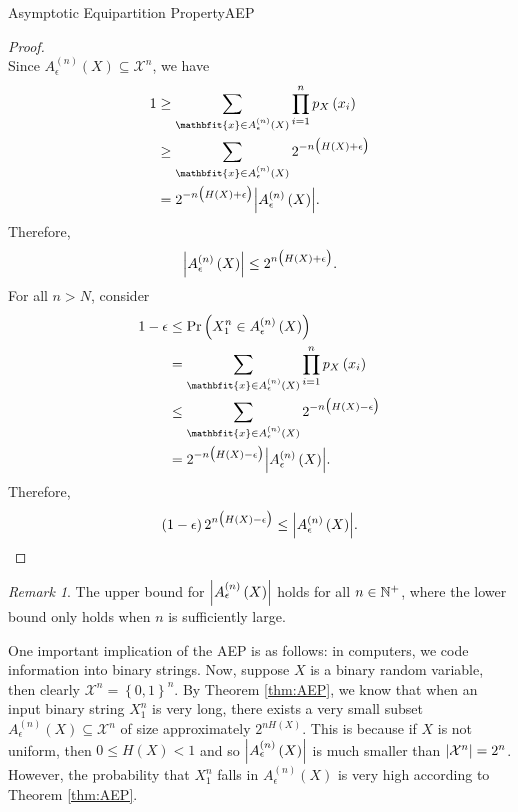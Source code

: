\documentclass[math, code]{amznotes}
\theoremstyle{remark}
\newtheorem*{remark}{Remark}
\begin{document}
\begin{thmbox}{Asymptotic Equipartition Property}{AEP}
\begin{proof}
\begin{equation*}
        \end{equation*}
        Since $A_{\epsilon}^{\left(n\right)}\left(X\right) \subseteq \mathcal{X}^n$, we have 
        \begin{align*}
            1 & \geq \sum_{\mathbfit{x} \in A_{\epsilon}^{\left(n\right)}\left(X\right)}\prod_{i = 1}^{n}p_X\left(x_i\right) \\
            & \geq \sum_{\mathbfit{x} \in A_{\epsilon}^{\left(n\right)}\left(X\right)}2^{-n\bigl(H\left(X\right) + \epsilon\bigr)} \\
            & = 2^{-n\bigl(H\left(X\right) + \epsilon\bigr)}\abs{A_{\epsilon}^{\left(n\right)}\left(X\right)}.
        \end{align*}
        Therefore, 
        \begin{equation*}
            {\left\lvert {A_{\epsilon}^{\left(n\right)}\left(X\right)} \right\rvert} \leq 2^{n\bigl(H\left(X\right) + \epsilon\bigr)}.
        \end{equation*}
        For all $n > N$, consider 
        \begin{align*}
            1 - \epsilon & \leq \Pr\left(X_1^n \in A_{\epsilon}^{\left(n\right)}\left(X\right)\right) \\
            & = \sum_{\mathbfit{x} \in A_{\epsilon}^{\left(n\right)}\left(X\right)}\prod_{i = 1}^{n}p_X\left(x_i\right) \\
            & \leq \sum_{\mathbfit{x} \in A_{\epsilon}^{\left(n\right)}\left(X\right)}2^{-n\bigl(H\left(X\right) - \epsilon\bigr)} \\
            & = 2^{-n\bigl(H\left(X\right) - \epsilon\bigr)}\abs{A_{\epsilon}^{\left(n\right)}\left(X\right)}.
        \end{align*}
        Therefore, 
        \begin{equation*}
            \left(1 - \epsilon\right)2^{n\bigl(H\left(X\right) - \epsilon\bigr)} \leq {\left\lvert {A_{\epsilon}^{\left(n\right)}\left(X\right)} \right\rvert}.
        \end{equation*}
    \end{proof}
\end{thmbox}
\begin{notebox}
    \begin{remark}
        The upper bound for ${\left\lvert {A_{\epsilon}^{\left(n\right)}\left(X\right)} \right\rvert}$ holds for all $n \in \mathbb{N}^+$, where the lower bound only holds when $n$ is sufficiently large.
    \end{remark}
\end{notebox}
One important implication of the AEP is as follows: in computers, we code information into binary strings. Now, suppose $X$ is a binary random variable, then clearly $\mathcal{X}^n = \left\{0, 1\right\}^n$. By Theorem \ref{thm:AEP}, we know that when an input binary string $X_1^n$ is very long, there exists a very small subset $A_{\epsilon}^{\left(n\right)}\left(X\right) \subseteq \mathcal{X}^n$ of size approximately $2^{nH\left(X\right)}$. This is because if $X$ is not uniform, then $0 \leq H\left(X\right) < 1$ and so ${\left\lvert {A_{\epsilon}^{\left(n\right)}\left(X\right)} \right\rvert}$ is much smaller than ${\left\lvert {\mathcal{X}^n} \right\rvert} = 2^n$. However, the probability that $X_1^n$ falls in $A_{\epsilon}^{\left(n\right)}\left(X\right)$ is very high according to Theorem \ref{thm:AEP}.
\end{document}
